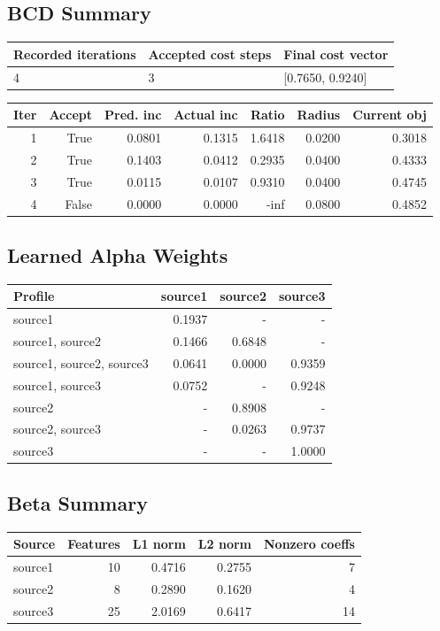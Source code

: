 \documentclass[11pt]{article}
\begin{document}
\subsection*{BCD Summary}
\begin{tabular}{lll}
\toprule
Recorded iterations & Accepted cost steps & Final cost vector \\
\midrule
4 & 3 & [0.7650, 0.9240] \\
\bottomrule
\end{tabular}

\begin{center}
\begin{tabular}{rrrrrrr}
\toprule
Iter & Accept & Pred. inc & Actual inc & Ratio & Radius & Current obj \\
\midrule
1 & True & 0.0801 & 0.1315 & 1.6418 & 0.0200 & 0.3018 \\
2 & True & 0.1403 & 0.0412 & 0.2935 & 0.0400 & 0.4333 \\
3 & True & 0.0115 & 0.0107 & 0.9310 & 0.0400 & 0.4745 \\
4 & False & 0.0000 & 0.0000 & -inf & 0.0800 & 0.4852 \\

\bottomrule
\end{tabular}
\end{center}

\subsection*{Learned Alpha Weights}
\begin{center}
\begin{tabular}{lrrr}
\toprule
Profile & source1 & source2 & source3 \\
\midrule
source1 & 0.1937 & - & - \\
source1, source2 & 0.1466 & 0.6848 & - \\
source1, source2, source3 & 0.0641 & 0.0000 & 0.9359 \\
source1, source3 & 0.0752 & - & 0.9248 \\
source2 & - & 0.8908 & - \\
source2, source3 & - & 0.0263 & 0.9737 \\
source3 & - & - & 1.0000 \\

\bottomrule
\end{tabular}
\end{center}

\subsection*{Beta Summary}
\begin{center}
\begin{tabular}{lrrrr}
\toprule
Source & Features & L1 norm & L2 norm & Nonzero coeffs \\
\midrule
source1 & 10 & 0.4716 & 0.2755 & 7 \\
source2 & 8 & 0.2890 & 0.1620 & 4 \\
source3 & 25 & 2.0169 & 0.6417 & 14 \\

\bottomrule
\end{tabular}
\end{center}
\end{document}
